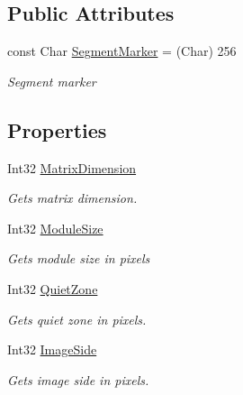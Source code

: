 \subsection*{Public Attributes}
\begin{DoxyCompactItemize}
\item 
const Char \hyperlink{class_pdf_file_writer_1_1_pdf_q_r_code_ae3db15764618c682e0fb406c5c86f594}{Segment\+Marker} = (Char) 256
\begin{DoxyCompactList}\small\item\em Segment marker \end{DoxyCompactList}\end{DoxyCompactItemize}
\subsection*{Properties}
\begin{DoxyCompactItemize}
\item 
Int32 \hyperlink{class_pdf_file_writer_1_1_pdf_q_r_code_a19fe9c90a11671df950a17ffaf000dcd}{Matrix\+Dimension}
\begin{DoxyCompactList}\small\item\em Gets matrix dimension. \end{DoxyCompactList}\item 
Int32 \hyperlink{class_pdf_file_writer_1_1_pdf_q_r_code_ac57e47763e02cc125712d36d3ee0cbb4}{Module\+Size}
\begin{DoxyCompactList}\small\item\em Gets module size in pixels \end{DoxyCompactList}\item 
Int32 \hyperlink{class_pdf_file_writer_1_1_pdf_q_r_code_abd6ef31fa2de6c82296a7bab9a009066}{Quiet\+Zone}
\begin{DoxyCompactList}\small\item\em Gets quiet zone in pixels. \end{DoxyCompactList}\item 
Int32 \hyperlink{class_pdf_file_writer_1_1_pdf_q_r_code_a5243b2f579536cf881a4adf5fedacafe}{Image\+Side}\hypertarget{class_pdf_file_writer_1_1_pdf_q_r_code_a5243b2f579536cf881a4adf5fedacafe}{}\label{class_pdf_file_writer_1_1_pdf_q_r_code_a5243b2f579536cf881a4adf5fedacafe}

\begin{DoxyCompactList}\small\item\em Gets image side in pixels. \end{DoxyCompactList}\end{DoxyCompactItemize}


